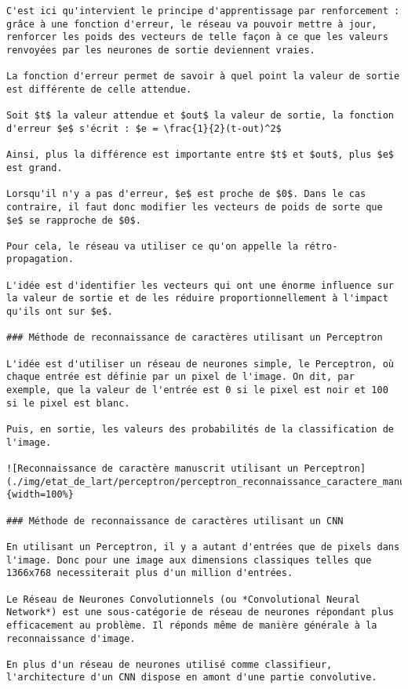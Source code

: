 \documentclass[
12pt,
french,
]{article}
\begin{document}
\begin{lstlisting}
C'est ici qu'intervient le principe d'apprentissage par renforcement : grâce à une fonction d'erreur, le réseau va pouvoir mettre à jour, renforcer les poids des vecteurs de telle façon à ce que les valeurs renvoyées par les neurones de sortie deviennent vraies.

La fonction d'erreur permet de savoir à quel point la valeur de sortie est différente de celle attendue.

Soit $t$ la valeur attendue et $out$ la valeur de sortie, la fonction d'erreur $e$ s'écrit : $e = \frac{1}{2}(t-out)^2$

Ainsi, plus la différence est importante entre $t$ et $out$, plus $e$ est grand.

Lorsqu'il n'y a pas d'erreur, $e$ est proche de $0$. Dans le cas contraire, il faut donc modifier les vecteurs de poids de sorte que $e$ se rapproche de $0$.

Pour cela, le réseau va utiliser ce qu'on appelle la rétro-propagation.

L'idée est d'identifier les vecteurs qui ont une énorme influence sur la valeur de sortie et de les réduire proportionnellement à l'impact qu'ils ont sur $e$.

### Méthode de reconnaissance de caractères utilisant un Perceptron

L'idée est d'utiliser un réseau de neurones simple, le Perceptron, où chaque entrée est définie par un pixel de l'image. On dit, par exemple, que la valeur de l'entrée est 0 si le pixel est noir et 100 si le pixel est blanc.

Puis, en sortie, les valeurs des probabilités de la classification de l'image.

![Reconnaissance de caractère manuscrit utilisant un Perceptron](./img/etat_de_lart/perceptron/perceptron_reconnaissance_caractere_manuscrit/perceptron_reconnaissance_caractere_manuscrit.PNG){width=100%}

### Méthode de reconnaissance de caractères utilisant un CNN

En utilisant un Perceptron, il y a autant d'entrées que de pixels dans l'image. Donc pour une image aux dimensions classiques telles que 1366x768 necessiterait plus d'un million d'entrées.

Le Réseau de Neurones Convolutionnels (ou *Convolutional Neural Network*) est une sous-catégorie de réseau de neurones répondant plus efficacement au problème. Il réponds même de manière générale à la reconnaissance d'image.

En plus d'un réseau de neurones utilisé comme classifieur, l'architecture d'un CNN dispose en amont d'une partie convolutive.


\end{lstlisting}
\end{document}
